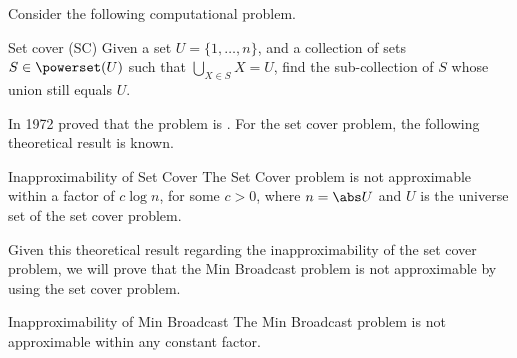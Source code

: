 \documentclass[a4paper, 12pt]{report}
\begin{document}
    Consider the following computational problem.

    \begin{frameddefn}[label={set cover}]{Set cover (SC)}
        Given a  set $U = \{1, \ldots, n\}$, and a collection of sets $S \in \powerset(U)$ such that $\bigcup_{X \in S}{X} = U$, find the  sub-collection of $S$ whose union still equals $U$.
    \end{frameddefn}

    In 1972 \textcite{karp} proved that the  problem is \NPComplete. For the set cover problem, the following theoretical result is known.

    \begin{framedthm}[label={sc inapprox}]{Inapproximability of Set Cover}
        The Set Cover problem is not approximable within a factor of $c \log n$, for some $c > 0$, where $n = \abs U$ and $U$ is the universe set of the set cover problem.
    \end{framedthm}

    Given this theoretical result regarding the inapproximability of the set cover problem, we will prove that the Min Broadcast problem is not approximable by using the set cover problem.

    \begin{framedthm}{Inapproximability of Min Broadcast}
        The Min Broadcast problem is not approximable within any constant factor.
    \end{framedthm}
\end{document}
